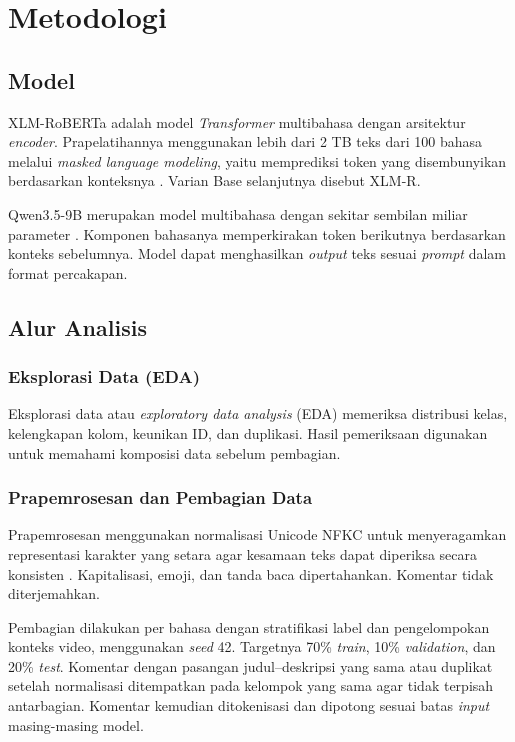\documentclass[11pt]{article}
\begin{document}
\section{Metodologi}
\subsection{Model}
XLM-RoBERTa adalah model \textit{Transformer} multibahasa dengan arsitektur \textit{encoder}. Prapelatihannya menggunakan lebih dari 2 TB teks dari 100 bahasa melalui \textit{masked language modeling}, yaitu memprediksi token yang disembunyikan berdasarkan konteksnya \citep{conneau-etal-2020-unsupervised}. Varian Base selanjutnya disebut XLM-R.

Qwen3.5-9B merupakan model multibahasa dengan sekitar sembilan miliar parameter \citep{qwen-team-2026-qwen35}. Komponen bahasanya memperkirakan token berikutnya berdasarkan konteks sebelumnya. Model dapat menghasilkan \textit{output} teks sesuai \textit{prompt} dalam format percakapan.

\subsection{Alur Analisis}
\subsubsection{Eksplorasi Data (EDA)}
Eksplorasi data atau \textit{exploratory data analysis} (EDA) memeriksa distribusi kelas, kelengkapan kolom, keunikan ID, dan duplikasi. Hasil pemeriksaan digunakan untuk memahami komposisi data sebelum pembagian.

\subsubsection{Prapemrosesan dan Pembagian Data}
Prapemrosesan menggunakan normalisasi Unicode NFKC untuk menyeragamkan representasi karakter yang setara agar kesamaan teks dapat diperiksa secara konsisten \citep{unicode-consortium-2026-normalization}. Kapitalisasi, emoji, dan tanda baca dipertahankan. Komentar tidak diterjemahkan.

Pembagian dilakukan per bahasa dengan stratifikasi label dan pengelompokan konteks video, menggunakan \textit{seed} 42. Targetnya 70\% \textit{train}, 10\% \textit{validation}, dan 20\% \textit{test}. Komentar dengan pasangan judul--deskripsi yang sama atau duplikat setelah normalisasi ditempatkan pada kelompok yang sama agar tidak terpisah antarbagian. Komentar kemudian ditokenisasi dan dipotong sesuai batas \textit{input} masing-masing model.
\end{document}
